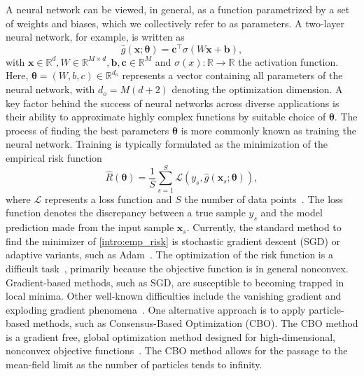 \documentclass[a4paper, 11pt]{article}
\newcommand{\R}{\mathbb{R}}
\theoremstyle{plain} %
\begin{document}
	A neural network can be viewed, in general, as a function parametrized by a set of weights and biases, which we collectively refer to as parameters. A two-layer neural network, for example, is written as
	\begin{equation}\label{intro:nn_matrix}
		\hat{g}(\bm{x}; \bm{\theta}) = \bm{c}^{\top} \sigma \left( W\bm{x} + \bm{b} \right), 
	\end{equation}
	with $ \bm{x} \in \R^{d}, W \in \R^{M \times d}, \bm{b}, \bm{c} \in \R^{M}$ and $ \sigma(x) : \R \to \R $ the activation function. Here, \mbox{$\bm{\theta}  = \left(W, b, c\right) \in \R^{d_{o}}$} represents a vector containing all parameters of the neural network, with $ d_{o} = M(d+2) $ denoting the optimization dimension. A key factor behind the success of neural networks across diverse applications is their ability to approximate highly complex functions by suitable choice of $ \bm{\theta} $. The process of finding the best parameters $ \bm{\theta} $ is more commonly known as training the neural network. Training is typically formulated as the minimization of the empirical risk function
	\begin{equation}\label{intro:emp_risk}
		\hat{R}(\bm{\theta}) = \frac{1}{S}\sum_{s=1}^{S} \mathcal{L}\left(y_{s}, \hat{g} \left( \bm{x}_s; \bm{\theta} \right)\right), 
	\end{equation}
	where $ \mathcal{L} $ represents a loss function and $ S $ the number of data points~\cite{vapnik1999}. The loss function denotes the discrepancy between a true sample $y_{s}$ and the model prediction made from the input sample $\bm{x}_{s}$. Currently, the standard method to find the minimizer of \eqref{intro:emp_risk} is stochastic gradient descent (SGD) or adaptive variants, such as Adam~\cite{bottou-98x,kingma2015adam}. The optimization of the risk function is a difficult task~\cite{goodfellowDeepLearning2016,glorot2010}, primarily because the objective function is in general nonconvex. Gradient-based methods, such as SGD, are susceptible to becoming trapped in local minima. Other well-known difficulties include the vanishing gradient and exploding gradient phenomena~\cite{pascanu2013,bengio1994}. One alternative approach is to apply particle-based methods, such as Consensus-Based Optimization (CBO). The CBO method is a gradient free, global optimization method designed for high-dimensional, nonconvex objective functions~\cite{pinnauConsensusbasedModelGlobal2017a, carrillo2018, carrillo2021, gerber2025, carrillo2022b, huang2022, kossMeanFieldLimit2024a, fornasier2022, fornasier2024, fornasier2021, borghi2023, carrillo2023, borghi2022,ha2020, ha2021}. The CBO method allows for the passage to the mean-field limit as the number of particles tends to infinity.
\end{document}
